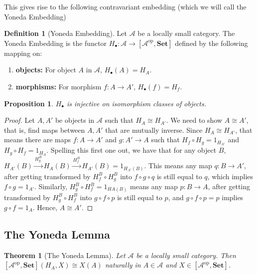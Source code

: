 \documentclass[11pt]{article}
\theoremstyle{definition}
\newtheorem*{defn}{Definition}
\theoremstyle{definition}
\theoremstyle{plain}
\newtheorem{theo}{Theorem}
\theoremstyle{plain}
\newtheorem{prop}{Proposition}
\theoremstyle{plain}
\begin{document}
This gives rise to the following contravariant embedding (which we will call the Yoneda Embedding)

\begin{defn}[Yoneda Embedding]
Let $\mathscr{A}$ be a locally small category. The Yoneda Embedding is the functor $H_{\bullet}:\mathscr{A} \to [\mathscr{A}^{\text{op}},\textbf{Set}]$ defined by the following mapping on:

\begin{enumerate}
\item \textbf{objects: } For object $A$ in $\mathscr{A}$, $H_{\bullet}(A) = H_A$.
\item \textbf{morphisms: } For morphism $f: A \to A'$, $H_{\bullet}(f) = H_f$.
\end{enumerate}
\end{defn}

\begin{prop}
$H_{\bullet}$ is injective on isomorphism classes of objects.
\end{prop}

\begin{proof}
Let $A,A'$ be objects in $\mathscr{A}$ such that $H_A \cong H_{A'}$. We need to show $A \cong A'$, that is, find maps between $A, A'$ that are mutually inverse. Since $H_A \cong H_{A'}$, that means there are maps $f: A \to A'$ and $g: A' \to A$ such that $H_f \circ H_g = 1_{H_{A'}}$ and $H_g \circ H_f = 1_{H_{A}}$. Spelling this first one out, we have that for any object $B$, $H_{A'}(B) \overset{H_g^B}{\longrightarrow} H_A(B) \overset{H_f^B}{\longrightarrow} H_{A'}(B) = 1_{H_{A'}(B)}$. This means any map $q: B \to A'$, after getting transformed by $H_f^B \circ H_g^B$ into $f \circ g \circ q$ is still equal to $q$, which implies $f \circ g = 1_{A'}$. Similarly, $H_g^B \circ H_f^B = 1_{H{A}(B)}$ means any map $p: B \to A$, after getting transformed by $H_g^B \circ H_f^B$ into $g \circ f \circ p$ is still equal to $p$, and $g \circ f \circ p = p$ implies $g \circ f = 1_{A}$. Hence, $A \cong A'$.
\end{proof}

\subsection*{The Yoneda Lemma}

\begin{theo}[The Yoneda Lemma]
Let $\mathscr{A}$ be a locally small category. Then $[\mathscr{A}^{\text{op}}, \textbf{Set}](H_A,X) \cong X(A)$ naturally in $A \in \mathscr{A}$ and $X \in [\mathscr{A}^{\text{op}}, \textbf{Set}]$.
\end{theo}

\nocite{*}


\end{document}
